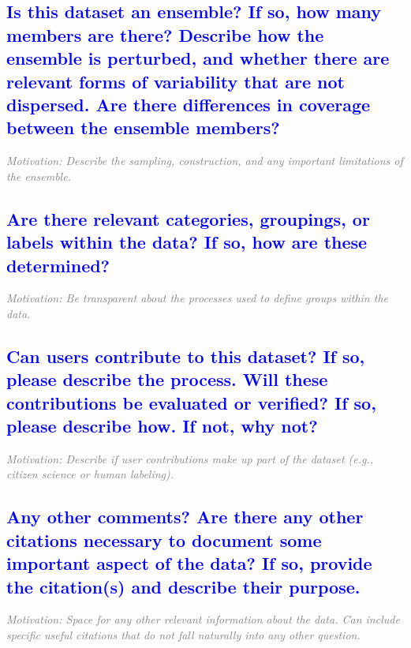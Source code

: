 \documentclass[letterpaper, 10 pt, transmag]{IEEEtran}
\begin{document}
\textcolor{blue}{\subsection{Is this dataset an ensemble? If so, how many members are there? Describe how the ensemble is perturbed, and whether there are relevant forms of variability that are not dispersed. Are there differences in coverage between the ensemble members?}}
\textcolor{gray}{\textit{Motivation: Describe the sampling, construction, and any important limitations of the ensemble.}}

\textcolor{blue}{\subsection{Are there relevant categories, groupings, or labels within the data? If so, how are these determined?}}
\textcolor{gray}{\textit{Motivation: Be transparent about the processes used to define groups within the data.}}

\textcolor{blue}{\subsection{Can users contribute to this dataset? If so, please describe the process. Will these contributions be evaluated or verified? If so, please describe how. If not, why not?}}
\textcolor{gray}{\textit{Motivation: Describe if user contributions make up part of the dataset (e.g., citizen science or human labeling).}}

\textcolor{blue}{\subsection{Any other comments? Are there any other citations necessary to document some important aspect of the data? If so, provide the citation(s) and describe their purpose.}}
\textcolor{gray}{\textit{Motivation: Space for any other relevant information about the data. Can include specific useful citations that do not fall naturally into any other question.}}


\bigskip
 
  

\end{document}
